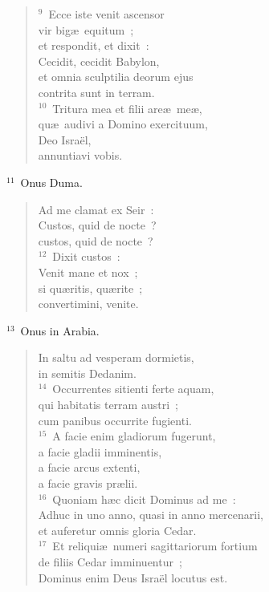 \begin{flushleft}
\begin{verse}
${}^{9}$~Ecce iste venit ascensor\\ vir big\ae\ equitum~;\\ et respondit, et dixit~:\\ Cecidit, cecidit Babylon,\\ et omnia sculptilia deorum ejus\\ contrita sunt in terram.\\
${}^{10}$~Tritura mea et filii are\ae\ me\ae ,\\ qu\ae\ audivi a Domino exercituum,\\ Deo Isra\"el,\\ annuntiavi vobis.\end{verse}\end{flushleft}


${}^{11}$~Onus Duma. \begin{flushleft}\begin{verse}Ad me clamat ex Seir~:\\ Custos, quid de nocte~?\\ custos, quid de nocte~?\\
${}^{12}$~Dixit custos~:\\ Venit mane et nox~;\\ si qu\ae ritis, qu\ae rite~;\\ convertimini, venite.\end{verse}\end{flushleft}


${}^{13}$~Onus in Arabia. \begin{flushleft}\begin{verse}In saltu ad vesperam dormietis,\\ in semitis Dedanim.\\
${}^{14}$~Occurrentes sitienti ferte aquam,\\ qui habitatis terram austri~;\\ cum panibus occurrite fugienti.\\
${}^{15}$~A facie enim gladiorum fugerunt,\\ a facie gladii imminentis,\\ a facie arcus extenti,\\ a facie gravis pr\ae lii.\\
${}^{16}$~Quoniam h\ae c dicit Dominus ad me~:\\ Adhuc in uno anno, quasi in anno mercenarii,\\ et auferetur omnis gloria Cedar.\\
${}^{17}$~Et reliqui\ae\ numeri sagittariorum fortium\\ de filiis Cedar imminuentur~;\\ Dominus enim Deus Isra\"el locutus est.\end{verse}\end{flushleft}


